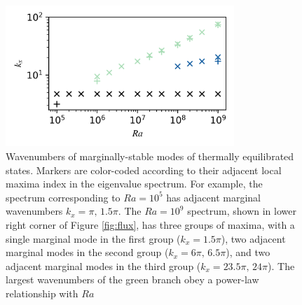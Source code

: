 \documentclass[reprint,amsmath,amssymb,aps]{revtex4-1}
\begin{document}
\begin{figure}
    \centering
    \includegraphics[width=3.4in]{kx_m_ra1.png}
    \caption{Wavenumbers of marginally-stable modes of thermally equilibrated states. 
    Markers are color-coded according to their adjacent local maxima index in the eigenvalue spectrum. 
    For example, the spectrum corresponding to $Ra = 10^5$ has adjacent marginal wavenumbers $k_x = \pi, \, 1.5\pi$. 
    The $Ra = 10^9$ spectrum, shown in lower right corner of Figure \ref{fig:flux}, has three groups of maxima, with a single marginal mode in the first group ($k_x = 1.5\pi$), two adjacent marginal modes in the second group ($k_x = 6\pi, \, 6.5\pi$), and two adjacent marginal modes in the third group ($k_x = 23.5\pi, \, 24\pi$). 
    The largest wavenumbers of the green branch obey a power-law relationship with $Ra$}
    \label{fig:kx_marginals}
\end{figure}
\end{document}
